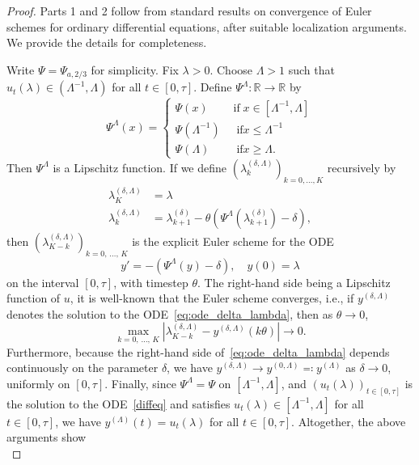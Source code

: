 \documentclass[AHL,Unicode,longabstracts,published]{cedram}
\newcommand*\R{\mathbb{R}}
\newcommand{\1} {\mathds{1}}
\renewcommand*\to{\rightarrow}
\newcommand*\tif{\ensuremath{\text{ if}}}
\begin{document}
\begin{proof}
Parts 1 and 2 follow from standard results on convergence of Euler schemes for ordinary differential equations, after suitable localization arguments. We provide the details for completeness.

Write $\Psi = \Psi_{a,2/3}$ for simplicity. Fix $\lambda > 0$. Choose $\Lambda > 1$ such that $u_t(\lambda) \in (\Lambda^{-1},\Lambda)$ for all $t\in [0,\tau]$. Define $\Psi^\Lambda:\R\to\R$ by
\[
\Psi^\Lambda(x) =
\begin{cases}
\Psi(x) & \tif\; x\in \left[\Lambda^{-1},\Lambda\right]\\
\Psi\left(\Lambda^{-1}\right) &\; \tif x\le \Lambda^{-1}\\
\Psi(\Lambda) &\; \tif x \ge \Lambda.
\end{cases}
\]
Then $\Psi^\Lambda$ is a Lipschitz function. If we define $(\lambda_k^{(\delta,\Lambda)})_{k=0,\ldots,K}$ recursively by
\begin{align*}
\lambda_K^{(\delta, \Lambda)} &= \lambda\\
\lambda_k^{(\delta, \Lambda)} &= \lambda_{k+1}^{(\delta)} - \theta\left(\Psi^\Lambda\left(\lambda_{k+1}^{(\delta)}\right) - \delta\right),
\end{align*}
then $(\lambda_{K-k}^{(\delta,\Lambda)})_{k=0,\,\ldots,\,K}$ is the explicit Euler scheme for the ODE
\begin{equation}\label{eq:ode_delta_lambda}
y' = -\left(\Psi^\Lambda(y)-\delta\right),\quad y(0) = \lambda
\end{equation}
on the interval $[0,\tau]$, with timestep $\theta$. The right-hand side being a Lipschitz function of $u$, it is well-known that the Euler scheme converges, i.e., if $y^{(\delta,\Lambda)}$ denotes the solution to the ODE~\eqref{eq:ode_delta_lambda}, then as $\theta\to 0$,
\[
\max_{k=0,\,\ldots,\,K} \left|\lambda_{K-k}^{(\delta,\Lambda)} - y^{(\delta,\Lambda)}(k\theta)\right| \to 0.
\]
Furthermore, because the right-hand side of~\eqref{eq:ode_delta_lambda} depends continuously on the parameter $\delta$, we have $y^{(\delta,\Lambda)} \to y^{(0,\Lambda)} \eqqcolon y^{(\Lambda)}$ as $\delta\to 0$, uniformly on $[0,\tau]$. Finally, since $\Psi^\Lambda = \Psi$ on $[\Lambda^{-1},\Lambda]$, and $(u_t(\lambda))_{t\in[0,\tau]}$ is the solution to the ODE~\eqref{diffeq} and satisfies $u_t(\lambda)\in [\Lambda^{-1},\Lambda]$ for all $t\in[0,\tau]$, we have $y^{(\Lambda)}(t) = u_t(\lambda)$ for all $t\in[0,\tau]$. Altogether, the above arguments show
\begin{equation}\label{eq:756}

\end{equation}
\end{proof}
\end{document}
